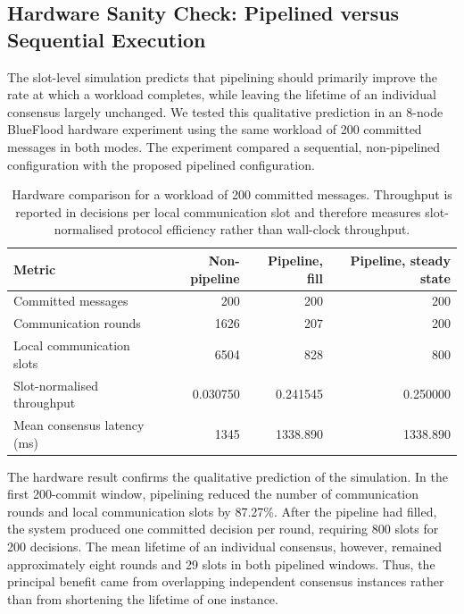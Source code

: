 \documentclass[journal]{IEEEtran}
\begin{document}
\subsection{Hardware Sanity Check: Pipelined versus Sequential Execution}
\label{sec:results-hardware}

The slot-level simulation predicts that pipelining should primarily improve
the rate at which a workload completes, while leaving the lifetime of an
individual consensus largely unchanged. We tested this qualitative
prediction in an 8-node BlueFlood hardware experiment using the same
workload of 200 committed messages in both modes. The experiment compared
a sequential, non-pipelined configuration with the proposed pipelined
configuration.

\begin{table}[!t]
\caption{Hardware comparison for a workload of 200 committed messages.
Throughput is reported in decisions per local communication slot and
therefore measures slot-normalised protocol efficiency rather than
wall-clock throughput.}
\label{tab:hardware-pipeline}
\centering
\footnotesize
\setlength{\tabcolsep}{8pt}
\begin{tabular}{@{}lrrr@{}}
\toprule
\textbf{Metric} &
\textbf{Non-pipeline} &
\textbf{Pipeline, fill} &
\textbf{Pipeline, steady state} \\
\midrule
Committed messages             & 200      & 200      & 200      \\
Communication rounds            & 1626     & 207      & 200      \\
Local communication slots       & 6504     & 828      & 800      \\
Slot-normalised throughput      & 0.030750 & 0.241545 & 0.250000 \\
Mean consensus latency (ms)     & 1345     & 1338.890 & 1338.890 \\
\bottomrule
\end{tabular}
\end{table}

The hardware result confirms the qualitative prediction of the simulation.
In the first 200-commit window, pipelining reduced the number of
communication rounds and local communication slots by 87.27\%. After the
pipeline had filled, the system produced one committed decision per round,
requiring 800 slots for 200 decisions. The mean lifetime of an individual
consensus, however, remained approximately eight rounds and 29 slots in
both pipelined windows. Thus, the principal benefit came from overlapping
independent consensus instances rather than from shortening the lifetime
of one instance.
\end{document}
